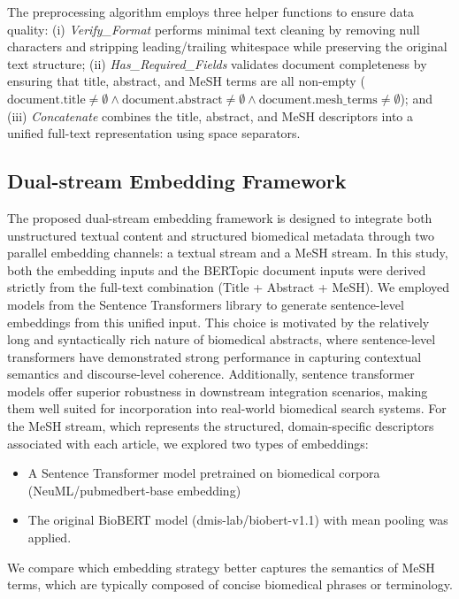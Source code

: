 \documentclass[authorproof,JACIII,researchpaper]{fujipressarticle}
\begin{document}
The preprocessing algorithm employs three helper functions to ensure data quality: (i) \textit{Verify\_Format} performs minimal text cleaning by removing null characters and stripping leading/trailing whitespace while preserving the original text structure; (ii) \textit{Has\_Required\_Fields} validates document completeness by ensuring that title, abstract, and MeSH terms are all non-empty ($\text{document.title} \neq \emptyset \land \text{document.abstract} \neq \emptyset \land \text{document.mesh\_terms} \neq \emptyset$); and (iii) \textit{Concatenate} combines the title, abstract, and MeSH descriptors into a unified full-text representation using space separators.

\subsection{Dual-stream Embedding Framework}
The proposed dual-stream embedding framework is designed to integrate both unstructured textual content and structured biomedical metadata through two parallel embedding channels: a textual stream and a MeSH stream.
In this study, both the embedding inputs and the BERTopic document inputs were derived strictly from the full-text combination (Title + Abstract + MeSH). We employed models from the Sentence Transformers library to generate sentence-level embeddings from this unified input. This choice is motivated by the relatively long and syntactically rich nature of biomedical abstracts, where sentence-level transformers have demonstrated strong performance in capturing contextual semantics and discourse-level coherence\cite{reimers_sentence-bert_2019}. Additionally, sentence transformer models offer superior robustness in downstream integration scenarios, making them well suited for incorporation into real-world biomedical search systems.
For the MeSH stream, which represents the structured, domain-specific descriptors associated with each article, we explored two types of embeddings:
\begin{itemize}
    \item A Sentence Transformer model pretrained on biomedical corpora (NeuML/pubmedbert-base embedding)
    \item The original BioBERT model (dmis-lab/biobert-v1.1) with mean pooling was applied.
\end{itemize}
We compare which embedding strategy better captures the semantics of MeSH terms, which are typically composed of concise biomedical phrases or terminology.
\end{document}
